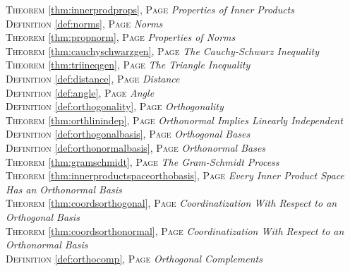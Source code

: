 \begin{multicols}{2}
{         \textsc{Theorem} \ref{thm:innerprodprops}, \textsc{Page} \pageref{thm:innerprodprops} \textit{Properties of Inner Products} \\
         \textsc{Definition} \ref{def:norms}, \textsc{Page} \pageref{def:norms} \textit{Norms} \\
         \textsc{Theorem} \ref{thm:propnorm}, \textsc{Page} \pageref{thm:propnorm} \textit{Properties of Norms} \\
         \textsc{Theorem} \ref{thm:cauchyschwarzgen}, \textsc{Page} \pageref{thm:cauchyschwarzgen} \textit{The Cauchy-Schwarz Inequality} \\
         \textsc{Theorem} \ref{thm:triineqgen}, \textsc{Page} \pageref{thm:triineqgen} \textit{The Triangle Inequality} \\
         \textsc{Definition} \ref{def:distance}, \textsc{Page} \pageref{def:distance} \textit{Distance} \\
         \textsc{Definition} \ref{def:angle}, \textsc{Page} \pageref{def:angle} \textit{Angle} \\
         \textsc{Definition} \ref{def:orthogonality}, \textsc{Page} \pageref{def:orthogonality} \textit{Orthogonality} \\
         \textsc{Theorem} \ref{thm:orthlinindep}, \textsc{Page} \pageref{thm:orthlinindep} \textit{Orthonormal Implies Linearly Independent} \\
         \textsc{Definition} \ref{def:orthogonalbasis}, \textsc{Page} \pageref{def:orthogonalbasis} \textit{Orthogonal Bases} \\
         \textsc{Definition} \ref{def:orthonormalbasis}, \textsc{Page} \pageref{def:orthonormalbasis} \textit{Orthonormal Bases} \\
         \textsc{Theorem} \ref{thm:gramschmidt}, \textsc{Page} \pageref{thm:gramschmidt} \textit{The Gram-Schmidt Process} \\
         \textsc{Theorem} \ref{thm:innerproductspaceorthobasis}, \textsc{Page} \pageref{thm:innerproductspaceorthobasis} \textit{Every Inner Product Space Has an Orthonormal Basis} \\
         \textsc{Theorem} \ref{thm:coordsorthogonal}, \textsc{Page} \pageref{thm:coordsorthogonal} \textit{Coordinatization With Respect to an Orthogonal Basis} \\
         \textsc{Theorem} \ref{thm:coordsorthonormal}, \textsc{Page} \pageref{thm:coordsorthonormal} \textit{Coordinatization With Respect to an Orthonormal Basis} \\
         \textsc{Definition} \ref{def:orthocomp}, \textsc{Page} \pageref{def:orthocomp} \textit{Orthogonal Complements} \\
}
\end{multicols}
